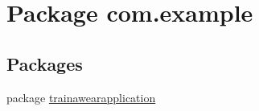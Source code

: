 \hypertarget{namespacecom_1_1example}{}\section{Package com.\+example}
\label{namespacecom_1_1example}
\subsection*{Packages}
\begin{DoxyCompactItemize}
\item 
package \mbox{\hyperlink{namespacecom_1_1example_1_1trainawearapplication}{trainawearapplication}}
\end{DoxyCompactItemize}
